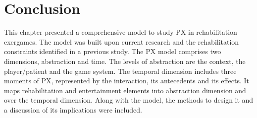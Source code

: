 \section{Conclusion} %
\label{sec:conclusion_model}

This chapter presented a comprehensive model to study \ac{PX} in rehabilitation exergames. The model was built upon current research and the rehabilitation constraints identified in a previous study. The \ac{PX} model comprises two dimensions, abstraction and time. The levels of abstraction are the context, the player/patient and the game system. The temporal dimension includes three moments of \ac{PX}, represented by the interaction, its antecedents and its effects. It maps rehabilitation and entertainment elements into abstraction dimension and over the temporal dimension. Along with the model, the methods to design it and a discussion of its implications were included.